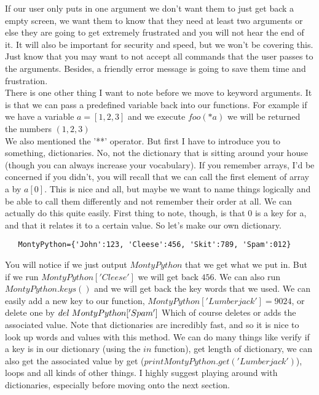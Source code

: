 \documentclass[11pt]{article}   %
\begin{document}
If our user only puts in one argument we don't want them to just get back a empty screen, we want them to know that they need at least two arguments or else they are going to get extremely frustrated and you will not hear the end of 
it.  It will also be important for security and speed, but we won't be covering this.  Just know that you may want to not accept all commands that the user passes to the arguments.  Besides, a friendly error message is going to 
save them time and frustration.\\
There is one other thing I want to note before we move to keyword arguments.  It is that we can pass a predefined variable back into our functions.  For example if we have a variable $a=[1,2,3]$ and we execute $foo(*a)$ we will be 
returned the numbers $(1,2,3)$
\\
We also mentioned the '**' operator. But first I have to introduce you to something, dictionaries.  No, not the dictionary that is sitting around your house (though you can always increase your vocabulary).  If you remember arrays,
I'd be concerned if you didn't, you will recall that we can call the first element of array a by $a[0]$.  This is nice and all, but maybe we want to name things logically and be able to call them differently and not remember their
order at all.  We can actually do this quite easily.  First thing to note, though, is that 0 is a key for a, and that it relates it to a certain value.  So let's make our own dictionary.
\begin{tcolorbox}
   \begin{lstlisting}
   MontyPython={'John':123, 'Cleese':456, 'Skit':789, 'Spam':012}
   \end{lstlisting}
\end{tcolorbox}
You will notice if we just output $MontyPython$ that we get what we put in.  But if we run $MontyPython['Cleese']$ we will get back $456$.  We can also run $MontyPython.keys()$ and we will get back the key words that we used.  We
 can easily add a new key to our function, $MontyPython['Lumberjack']=9024$, or delete one by $del\hspace{.1cm}MontyPython['Spam']$  Which of course deletes or adds the associated value.  Note that dictionaries are incredibly fast, and so it is nice to look up words and values with this method.
 We can do many things like verify if a key is in our dictionary (using the $in$ function), get length of dictionary, we can also get the associated value by get ($print MontyPython.get('Lumberjack')$), loops and all kinds of other
 things.  I highly suggest playing around with dictionaries, especially before moving onto the next section.\\
\end{document}
